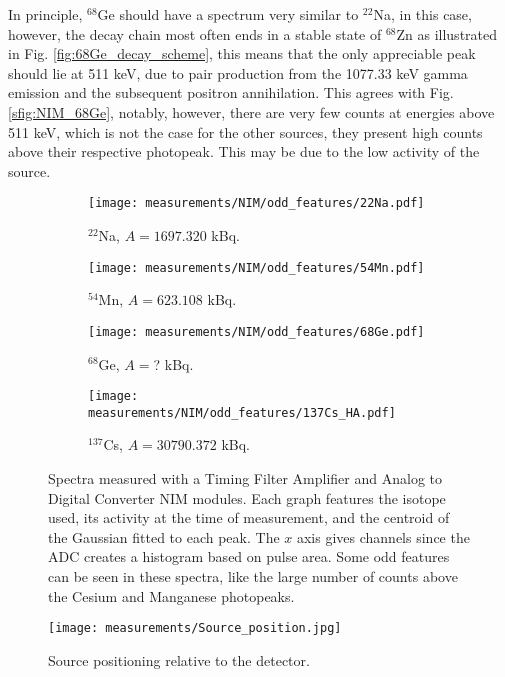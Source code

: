 In principle, $^{68}$Ge should have a spectrum very similar to $^{22}$Na, in this case, however, the decay chain most often ends in a stable state of $^{68}$Zn as illustrated in Fig. \ref{fig:68Ge_decay_scheme}, this means that the only appreciable peak should lie at 511 \unit{\kilo\eV}, due to pair production from the 1077.33 \unit{\kilo\eV} gamma emission and the subsequent positron annihilation. This agrees with Fig. \ref{sfig:NIM_68Ge}, notably, however, there are very few counts at energies above 511 \unit{\kilo\eV}, which is not the case for the other sources, they present high counts above their respective photopeak. This may be due to the low activity of the source. 

\begin{figure}[H]
  \begin{subfigure}[t]{0.47\textwidth}
    \centering
    \texttt{[image: measurements/NIM/odd\_features/22Na.pdf]}
    \caption{\label{sfig:NIM_odd_22Na}$^{22}$Na, $A=1697.320$ kBq.}
  \end{subfigure}
  \hfill
  \begin{subfigure}[t]{0.47\textwidth}
    \centering
    \texttt{[image: measurements/NIM/odd\_features/54Mn.pdf]}
    \caption{\label{sfig:NIM_odd_54Mn}$^{54}$Mn, $A=623.108$ kBq.}
  \end{subfigure}
  \medskip
  \begin{subfigure}[t]{0.47\textwidth}
    \centering
    \texttt{[image: measurements/NIM/odd\_features/68Ge.pdf]}
    \caption{\label{sfig:NIM_odd_68Ge}$^{68}$Ge, $A=$? kBq.}
  \end{subfigure}
  \hfill
  \begin{subfigure}[t]{0.47\textwidth}
    \centering
    \texttt{[image: measurements/NIM/odd\_features/137Cs\_HA.pdf]}
    \caption{\label{sfig:NIM_odd_137Cs}$^{137}$Cs, $A=30790.372$ kBq.}
  \end{subfigure}
  \caption{\label{fig:NIM_odd_features}Spectra measured with a Timing Filter Amplifier and Analog to Digital Converter NIM modules. Each graph features the isotope used, its activity at the time of measurement, and the centroid of the Gaussian fitted to each peak. The $x$ axis gives channels since the ADC creates a histogram based on pulse area. Some odd features can be seen in these spectra, like the large number of counts above the Cesium and Manganese photopeaks.}
\end{figure}

\begin{figure}[H]
  \centering
  \texttt{[image: measurements/Source\_position.jpg]}
  \caption{\label{fig:source_position}Source positioning relative to the detector.}
\end{figure}


